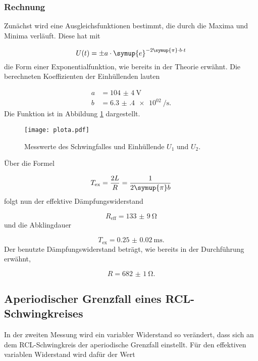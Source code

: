 \subsubsection{Rechnung}

Zunächst wird eine Ausgleichsfunktionen bestimmt, die durch die Maxima und
Minima verläuft.
Diese hat mit

\begin{equation}
  U(t) = \pm a \cdot \symup{e}^{-2\symup{\pi}\cdot b \cdot t}
\end{equation}
die Form einer Exponentialfunktion, wie bereits in der Theorie erwähnt.
Die berechneten Koeffizienten der Einhüllenden lauten

\begin{align}
  a & = \SI{104(4)}{\V} \\
  b & = \SI{6.3(4)e02}{\per\second}.
\end{align}
Die Funktion ist in Abbildung \ref{fig:Schwingfall} dargestellt.

\begin{figure}[h]
  \centering
  \texttt{[image: plota.pdf]}
  \caption{Messwerte des Schwingfalles und Einhüllende $U_1$ und $U_2$.}
  \label{fig:Schwingfall}
\end{figure}

Über die Formel

\begin{equation}
  T_\text{ex} = \frac{2L}{R} = \frac{1}{2\symup{\pi}b}
\end{equation}
folgt nun der effektive Dämpfungswiderstand

\begin{equation}
  R_\text{eff} = \SI{133(9)}{\ohm}
\end{equation}
und die Abklingdauer

\begin{equation}
  T_\text{ex} = \SI{0.25(2)}{\milli\second} .
\end{equation}
Der benutzte Dämpfungswiderstand beträgt, wie bereits in der Durchführung
erwähnt,

\begin{equation}
  R = \SI{682(1)}{\ohm} .
\end{equation}


\subsection{Aperiodischer Grenzfall eines RCL-Schwingkreises}

In der zweiten Messung wird ein variabler Widerstand so verändert, dass
sich an dem RCL-Schwingkreis der aperiodische Grenzfall einstellt.
Für den effektiven variablen Widerstand wird dafür der Wert

